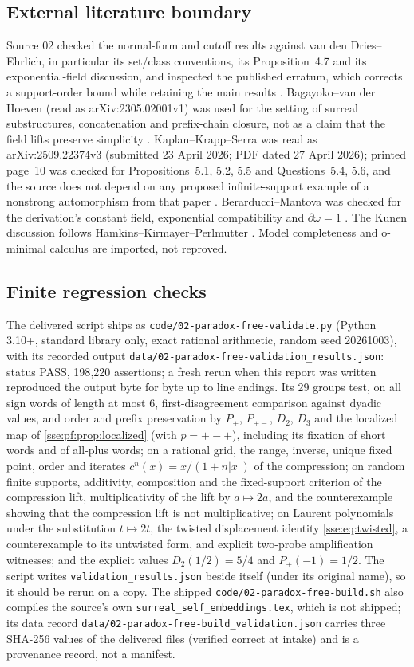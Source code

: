 \documentclass[11pt,a4paper]{article}
\numberwithin{equation}{section}
\theoremstyle{plain}
\theoremstyle{definition}
\theoremstyle{remark}
\newcommand{\fn}[1]{\nolinkurl{#1}}%
\begin{document}
\subsection{External literature boundary}
Source 02 checked the normal-form and cutoff results against van den
Dries--Ehrlich, in particular its set/class conventions, its
Proposition~4.7 and its exponential-field discussion, and inspected the
published erratum, which corrects a support-order bound while retaining the
main results \cite{vdDE}. Bagayoko--van der Hoeven (read as
arXiv:2305.02001v1) was used for the setting of surreal substructures,
concatenation and prefix-chain closure, not as a claim that the field lifts
preserve simplicity \cite{BVH}. Kaplan--Krapp--Serra was read as
arXiv:2509.22374v3 (submitted 23 April 2026; PDF dated 27 April 2026);
printed page~10 was checked for Propositions~5.1, 5.2, 5.5 and
Questions~5.4, 5.6, and the source does not depend on any proposed
infinite-support example of a nonstrong automorphism from that paper
\cite{KKS}. Berarducci--Mantova was checked for the derivation's constant
field, exponential compatibility and $\partial\omega=1$ \cite{BM}. The Kunen
discussion follows Hamkins--Kirmayer--Perlmutter \cite{pf-HKP}. Model
completeness \cite{Wilkie} and o-minimal calculus \cite{pf-Tame} are
imported, not reproved.

\subsection{Finite regression checks}\label{sse:pf:subsec:checks}
The delivered script ships as \fn{code/02-paradox-free-validate.py}
(Python 3.10+, standard library only, exact rational arithmetic, random seed
20261003), with its recorded output
\fn{data/02-paradox-free-validation_results.json}: status PASS, 198{,}220
assertions; a fresh rerun when this report was written reproduced the
output byte for byte up to line endings. Its 29 groups test, on all sign
words of length at most 6, first-disagreement comparison against dyadic
values, and order and prefix preservation by $P_+$, $P_{+-}$, $D_2$, $D_3$
and the localized map of \cref{sse:pf:prop:localized} (with $p=+-+$),
including its fixation of short words and of all-plus words; on a rational
grid, the range, inverse, unique fixed point, order and iterates
$c^n(x)=x/(1+n|x|)$ of the compression; on random finite supports,
additivity, composition and the fixed-support criterion of the compression
lift, multiplicativity of the lift by $a\mapsto 2a$, and the counterexample
showing that the compression lift is not multiplicative; on Laurent
polynomials under the substitution $t\mapsto2t$, the twisted displacement
identity \eqref{sse:eq:twisted}, a counterexample to its untwisted form,
and explicit two-probe amplification witnesses; and the explicit values
$D_2(1/2)=5/4$ and $P_+(-1)=1/2$. The script writes
\fn{validation_results.json} beside itself (under its original name), so
it should be rerun on a copy. The shipped
\fn{code/02-paradox-free-build.sh} also compiles the source's own
\fn{surreal_self_embeddings.tex}, which is not shipped; its data record
\fn{data/02-paradox-free-build_validation.json} carries three SHA-256 values
of the delivered files (verified correct at intake) and is a provenance
record, not a manifest.
\end{document}
